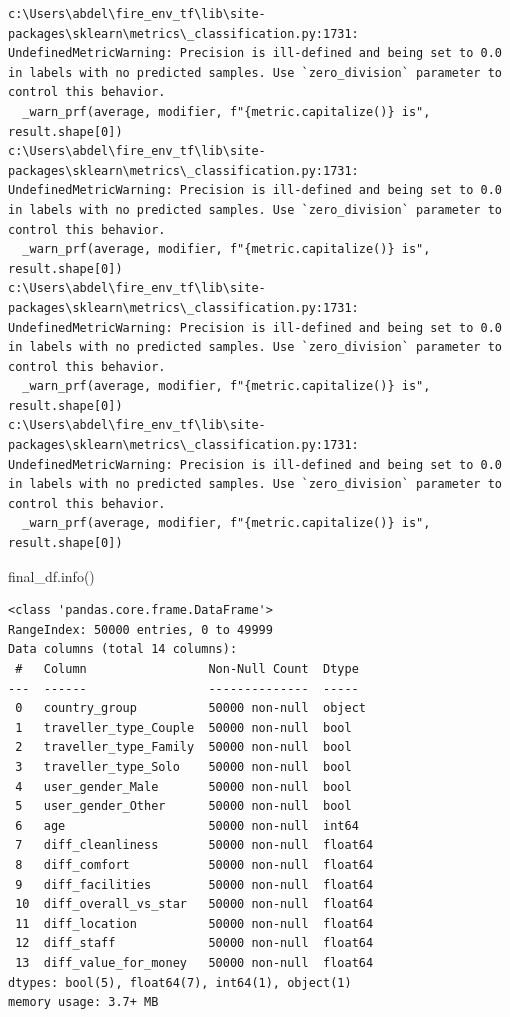 \documentclass[
  letterpaper,
  DIV=11,
  numbers=noendperiod]{scrartcl}
\newenvironment{Shaded}{\begin{snugshade}}{\end{snugshade}}
\newcommand{\NormalTok}[1]{\textcolor[rgb]{0.00,0.23,0.31}{#1}}
\begin{document}
\begin{verbatim}
c:\Users\abdel\fire_env_tf\lib\site-packages\sklearn\metrics\_classification.py:1731: UndefinedMetricWarning: Precision is ill-defined and being set to 0.0 in labels with no predicted samples. Use `zero_division` parameter to control this behavior.
  _warn_prf(average, modifier, f"{metric.capitalize()} is", result.shape[0])
c:\Users\abdel\fire_env_tf\lib\site-packages\sklearn\metrics\_classification.py:1731: UndefinedMetricWarning: Precision is ill-defined and being set to 0.0 in labels with no predicted samples. Use `zero_division` parameter to control this behavior.
  _warn_prf(average, modifier, f"{metric.capitalize()} is", result.shape[0])
c:\Users\abdel\fire_env_tf\lib\site-packages\sklearn\metrics\_classification.py:1731: UndefinedMetricWarning: Precision is ill-defined and being set to 0.0 in labels with no predicted samples. Use `zero_division` parameter to control this behavior.
  _warn_prf(average, modifier, f"{metric.capitalize()} is", result.shape[0])
c:\Users\abdel\fire_env_tf\lib\site-packages\sklearn\metrics\_classification.py:1731: UndefinedMetricWarning: Precision is ill-defined and being set to 0.0 in labels with no predicted samples. Use `zero_division` parameter to control this behavior.
  _warn_prf(average, modifier, f"{metric.capitalize()} is", result.shape[0])
\end{verbatim}

\begin{Shaded}
\begin{Highlighting}[]
\NormalTok{final\_df.info()}
\end{Highlighting}
\end{Shaded}

\begin{verbatim}
<class 'pandas.core.frame.DataFrame'>
RangeIndex: 50000 entries, 0 to 49999
Data columns (total 14 columns):
 #   Column                 Non-Null Count  Dtype  
---  ------                 --------------  -----  
 0   country_group          50000 non-null  object 
 1   traveller_type_Couple  50000 non-null  bool   
 2   traveller_type_Family  50000 non-null  bool   
 3   traveller_type_Solo    50000 non-null  bool   
 4   user_gender_Male       50000 non-null  bool   
 5   user_gender_Other      50000 non-null  bool   
 6   age                    50000 non-null  int64  
 7   diff_cleanliness       50000 non-null  float64
 8   diff_comfort           50000 non-null  float64
 9   diff_facilities        50000 non-null  float64
 10  diff_overall_vs_star   50000 non-null  float64
 11  diff_location          50000 non-null  float64
 12  diff_staff             50000 non-null  float64
 13  diff_value_for_money   50000 non-null  float64
dtypes: bool(5), float64(7), int64(1), object(1)
memory usage: 3.7+ MB
\end{verbatim}
\end{document}
